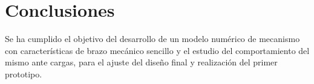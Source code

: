 \documentclass[11pt,a4paper,oldfontcommands,oneside]{memoir}
\begin{document}
\chapter{Conclusiones}
Se ha cumplido el objetivo del desarrollo de un modelo numérico de mecanismo con
características de brazo mecánico sencillo y el estudio del comportamiento del mismo ante
cargas, para el ajuste del diseño final y realización del primer prototipo.

\vspace{2cm}
\hfill



\end{document}
